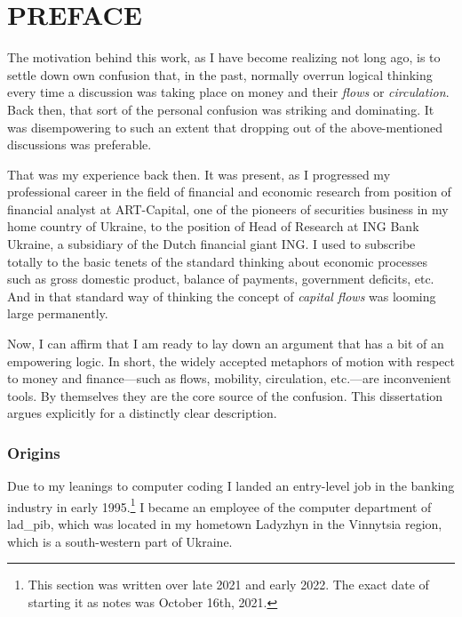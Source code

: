 %
%
\section*{\MakeUppercase{Preface}}

The motivation behind this work, as I have become realizing not long ago, is to settle down own confusion that, in the past, normally overrun logical thinking every time a discussion was taking place on money and their \textit{flows} or \textit{circulation}. Back then, that sort of the personal confusion was striking and dominating. It was disempowering to such an extent that dropping out of the above-mentioned discussions was preferable. 

That was my experience back then. It was present, as I progressed my professional career in the field of financial and economic research from position of financial analyst at ART-Capital, one of the pioneers of securities business in my home country of Ukraine, to the position of Head of Research at ING Bank Ukraine, a subsidiary of the Dutch financial giant ING. I used to subscribe totally to the basic tenets of the standard thinking about economic processes such as gross domestic product, balance of payments, government deficits, etc. And in that standard way of thinking the concept of \textit{capital flows} was looming large permanently.

Now, I can affirm that I am ready to lay down an argument that has a bit of an empowering logic. In short, the widely accepted metaphors of motion with respect to money and finance---such as flows, mobility, circulation, etc.---are inconvenient tools. By themselves they are the core source of the confusion. This dissertation argues explicitly for a distinctly clear description.

\subsubsection*{Origins}

Due to my leanings to computer coding I landed an entry-level job in the banking industry in early 1995.\footnote{This section was written over late 2021 and early 2022. The exact date of starting it as notes was October 16th, 2021.} I became an employee of the computer department of \ac{lad_pib}, which was located in my hometown Ladyzhyn in the Vinnytsia region, which is a south-western part of Ukraine.

